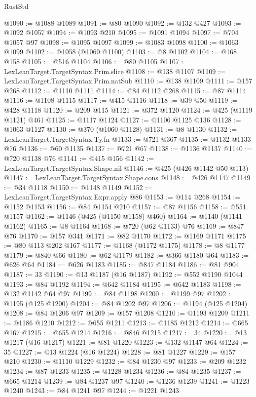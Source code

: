 \begin{lexlean}{RustStd}
\begin{coremodule}
{\begin{coremodule}
{{{{{{{{{{{{{{{{{{{{{{{{{{{{{{{{{{{{{{{{{{{{{{{{{{{{{@1090 := @1088 @1089
@1091 := @80 @1090
@1092 := @132 @427
@1093 := @1092 @1057
@1094 := @1093 @210
@1095 := @1091 @1094
@1097 := @704 @1057 @97
@1098 := @1095 @1097
@1099 := @1083 @1098
@1100 := @1063 @1099
@1102 := @1058 (@1060 @1100)
@1103 := @8 @1102
@1104 := @168 @158
@1105 := @516 @1104
@1106 := @80 @1105
@1107 := LexLeanTarget.TargetSyntax.Prim.slice
@1108 := @138 @1107
@1109 := LexLeanTarget.TargetSyntax.Prim.natSub
@1110 := @138 @1109
@1111 := @157 @268
@1112 := @1110 @1111
@1114 := @84 @1112 @268
@1115 := @87 @1114
@1116 := @1108 @1115
@1117 := @415 @1116
@1118 := @39 @50
@1119 := @428 @1118
@1120 := @209 @115
@1121 := @372 @1120
@1124 := @425 (@1119 @1121) @461
@1125 := @1117 @1124
@1127 := @1106 @1125 @136
@1128 := @1063 @1127
@1130 := @370 (@1060 @1128)
@1131 := @8 @1130
@1132 := LexLeanTarget.TargetSyntax.Ty.fn
@1133 := @721 @367
@1135 := @1132 @1133 @76
@1136 := @60 @1135
@1137 := @721 @67
@1138 := @1136 @1137
@1140 := @720 @1138 @76
@1141 := @415 @156
@1142 := LexLeanTarget.TargetSyntax.Shape.nil
@1146 := @425 (@426 @1142 @50 @113)
@1147 := LexLeanTarget.TargetSyntax.Shape.cons
@1148 := @426 @1147
@1149 := @34 @1118
@1150 := @1148 @1149
@1152 := LexLeanTarget.TargetSyntax.Expr.apply @86
@1153 := @114 @268
@1154 := @1152 @1153
@1156 := @84 @1154 @210
@1157 := @87 @1156
@1158 := @551 @1157
@1162 := @1146 (@425 (@1150 @1158) @460)
@1164 := @1140 (@1141 @1162)
@1165 := @8 @1164
@1168 := @720 (@62 @1133) @76
@1169 := @847 @76
@1170 := @157 @341
@1171 := @82 @1170
@1172 := @1169 @1171
@1175 := @80 @113 @202 @167
@1177 := @1168 (@1172 @1175)
@1178 := @8 @1177
@1179 := @840 @66
@1180 := @62 @1179
@1182 := @366 @1180 @64
@1183 := @626 @64
@1184 := @626 @1183
@1185 := @847 @1184
@1186 := @81 @904
@1187 := 33
@1190 := @13 @1187 (@16 @1187)
@1192 := @552 @1190 @1044
@1193 := @84 @1192
@1194 := @642 @1184
@1195 := @642 @1183
@1198 := @132 @1142 @64 @97
@1199 := @84 @1198
@1200 := @1199 @97
@1202 := @1195 (@125 @1200)
@1204 := @84 @1202 @97
@1206 := @1194 (@125 @1204)
@1208 := @84 @1206 @97
@1209 := @157 @1208
@1210 := @1193 @1209
@1211 := @1186 @1210
@1212 := @655 @1211
@1213 := @1185 @1212
@1214 := @665 @167
@1215 := @655 @1214
@1216 := @846 @1215
@1217 := 34
@1220 := @13 @1217 (@16 @1217)
@1221 := @81 @1220
@1223 := @132 @1147 @64
@1224 := 35
@1227 := @13 @1224 (@16 @1224)
@1228 := @81 @1227
@1229 := @157 @210
@1230 := @1110 @1229
@1232 := @84 @1230 @97
@1233 := @209 @1232
@1234 := @87 @1233
@1235 := @1228 @1234
@1236 := @84 @1235
@1237 := @665 @1214
@1239 := @84 @1237 @97
@1240 := @1236 @1239
@1241 := @1223 @1240
@1243 := @84 @1241 @97
@1244 := @1221 @1243
}}}}}}}}}}}}}}}}}}}}}}}}}}}}}}}}}}}}}}}}}}}}}}}}}}}}}
\end{coremodule}}
\end{coremodule}
\end{lexlean}

